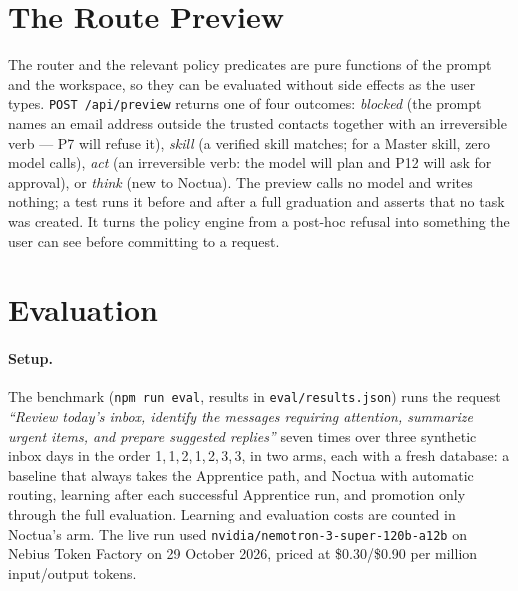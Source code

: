 \documentclass[11pt]{article}
\newcommand{\code}[1]{\texttt{#1}}
\begin{document}
\section{The Route Preview}\label{sec:preview}\label{sec:route}

The router and the relevant policy predicates are pure functions of the prompt and the workspace, so they can be
evaluated without side effects as the user types. \code{POST /api/preview} returns one of four outcomes:
\emph{blocked} (the prompt names an email address outside the trusted contacts together with an irreversible verb ---
P7 will refuse it), \emph{skill} (a verified skill matches; for a Master skill, zero model calls), \emph{act} (an
irreversible verb: the model will plan and P12 will ask for approval), or \emph{think} (new to Noctua). The preview
calls no model and writes nothing; a test runs it before and after a full graduation and asserts that no task
was created. It turns the policy engine from a
post-hoc refusal into something the user can see before committing to a request.

\section{Evaluation}\label{sec:eval}

\paragraph{Setup.} The benchmark (\code{npm run eval}, results in \code{eval/results.json}) runs the request
\emph{``Review today's inbox, identify the messages requiring attention, summarize urgent items, and prepare suggested
replies''} seven times over three synthetic inbox days in the order 1,\,1,\,2,\,1,\,2,\,3,\,3, in two arms, each with a
fresh database: a baseline that always takes the Apprentice path, and Noctua with automatic routing, learning after
each successful Apprentice run, and promotion only through the full evaluation. Learning and evaluation costs are
counted in Noctua's arm. The live run used \code{nvidia/nemotron-3-super-120b-a12b} on Nebius Token Factory on 29
October 2026, priced at \$0.30/\$0.90 per million input/output tokens.
\end{document}
